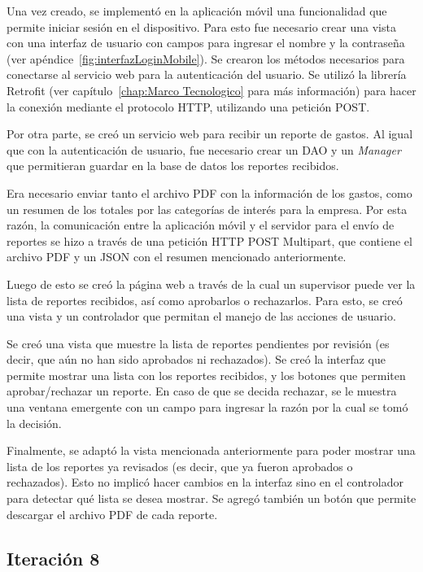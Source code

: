 Una vez creado, se implementó en la aplicación móvil una funcionalidad que permite iniciar sesión en el dispositivo. Para esto fue necesario crear una vista con una interfaz de usuario con campos para ingresar el nombre y la contraseña (ver apéndice~\ref{fig:interfazLoginMobile}). Se crearon los métodos necesarios para conectarse al servicio web para la autenticación del usuario. Se utilizó la librería Retrofit (ver capítulo~\ref{chap:Marco Tecnologico} para más información) para hacer la conexión mediante el protocolo HTTP, utilizando una petición POST.

Por otra parte, se creó un servicio web para recibir un reporte de gastos. Al igual que con la autenticación de usuario, fue necesario crear un DAO y un \textit{Manager} que permitieran guardar en la base de datos los reportes recibidos.

Era necesario enviar tanto el archivo PDF con la información de los gastos, como un resumen de los totales por las categorías de interés para la empresa. Por esta razón, la comunicación entre la aplicación móvil y el servidor para el envío de reportes se hizo a través de una petición HTTP POST Multipart, que contiene el archivo PDF y un JSON con el resumen mencionado anteriormente.

Luego de esto se creó la página web a través de la cual un supervisor puede ver la lista de reportes recibidos, así como aprobarlos o rechazarlos. Para esto, se creó una vista y un controlador que permitan el manejo de las acciones de usuario. 

Se creó una vista que muestre la lista de reportes pendientes por revisión (es decir, que aún no han sido aprobados ni rechazados). Se creó la interfaz que permite mostrar una lista con los reportes recibidos, y los botones que permiten aprobar/rechazar un reporte. En caso de que se decida rechazar, se le muestra una ventana emergente con un campo para ingresar la razón por la cual se tomó la decisión.

Finalmente, se adaptó la vista mencionada anteriormente para poder mostrar una lista de los reportes ya revisados (es decir, que ya fueron aprobados o rechazados). Esto no implicó hacer cambios en la interfaz sino en el controlador para detectar qué lista se desea mostrar. Se agregó también un botón que permite descargar el archivo PDF de cada reporte.

\subsection{Iteración 8}

